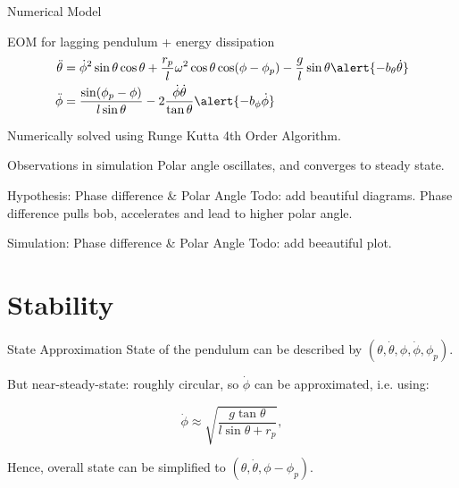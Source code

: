 \documentclass[10pt, compress]{beamer}
\begin{document}
\begin{frame}{Numerical Model}
    \begin{block}{EOM for lagging pendulum \alert{+ energy dissipation}}
    \begin{align*}
        \ddot{\theta} &= \dot{\phi}^2 \sin\theta\cos\theta + \frac{r_p}{l} \omega^2 \cos\theta\cos(\phi-\phi_p) - \frac{g}{l}\sin\theta \alert{- b_\theta \dot{\theta}}\\
        \ddot{\phi} &= \frac{\sin(\phi_p-\phi)}{l\sin\theta} - 2 \frac{\dot{\phi}\dot{\theta}}{\tan\theta} \alert{- b_\phi \dot{\phi}}
    \end{align*}
    \end{block}
    Numerically solved using Runge Kutta 4th Order Algorithm.
\end{frame}

\begin{frame}{Observations in simulation}
    Polar angle oscillates, and converges to steady state.
\end{frame}

\begin{frame}{Hypothesis: Phase difference \& Polar Angle}
    Todo: add beautiful diagrams.
    Phase difference pulls bob, accelerates and lead to higher polar angle.
\end{frame}

\begin{frame}{Simulation: Phase difference \& Polar Angle}
    Todo: add beeautiful plot.
\end{frame}

\section{Stability}

\begin{frame}{State Approximation}
    State of the pendulum can be described by $(\theta, \dot\theta, \phi, \dot\phi, \phi_p)$.
    
    But near-steady-state: roughly circular, so $\dot\phi$ can be approximated, i.e. using:
    
    \begin{equation*}
        \dot\phi \approx \sqrt{\frac{g\tan\theta}{l\sin\theta + r_p}},
    \end{equation*}
    
    Hence, overall state can be simplified to $(\theta, \dot\theta, \phi - \phi_p)$.
\end{frame}
\end{document}
